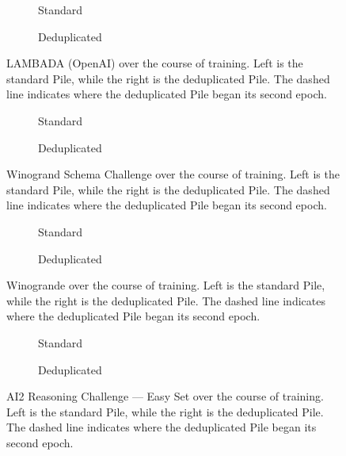 \documentclass{article}
\theoremstyle{plain}
\theoremstyle{definition}
\theoremstyle{remark}
\begin{document}
\begin{figure}[h]
\centering
\begin{subfigure}{0.45\columnwidth}
\centering
{}
\caption{Standard}
\end{subfigure}
\begin{subfigure}{0.45\columnwidth}
\centering
{}
\caption{Deduplicated}
\end{subfigure}
\caption{LAMBADA (OpenAI) over the course of training. Left is the standard Pile, while the right is the deduplicated Pile. The dashed line indicates where the deduplicated Pile began its second epoch.}
\end{figure}


\begin{figure}[h]
\centering
\begin{subfigure}{0.45\columnwidth}
\centering
{}
\caption{Standard}
\end{subfigure}
\begin{subfigure}{0.45\columnwidth}
\centering
{}
\caption{Deduplicated}
\end{subfigure}
\caption{Winogrand Schema Challenge over the course of training. Left is the standard Pile, while the right is the deduplicated Pile. The dashed line indicates where the deduplicated Pile began its second epoch.}
\end{figure}


\begin{figure}[h]
\centering
\begin{subfigure}{0.45\columnwidth}
\centering
{}
\caption{Standard}
\end{subfigure}
\begin{subfigure}{0.45\columnwidth}
\centering
{}
\caption{Deduplicated}
\end{subfigure}
\caption{Winogrande over the course of training. Left is the standard Pile, while the right is the deduplicated Pile. The dashed line indicates where the deduplicated Pile began its second epoch.}
\end{figure}


\begin{figure}[h]
\centering
\begin{subfigure}{0.45\columnwidth}
\centering
{}
\caption{Standard}
\end{subfigure}
\begin{subfigure}{0.45\columnwidth}
\centering
{}
\caption{Deduplicated}
\end{subfigure}
\caption{AI2 Reasoning Challenge --- Easy Set over the course of training. Left is the standard Pile, while the right is the deduplicated Pile. The dashed line indicates where the deduplicated Pile began its second epoch.}
\end{figure}
\end{document}
